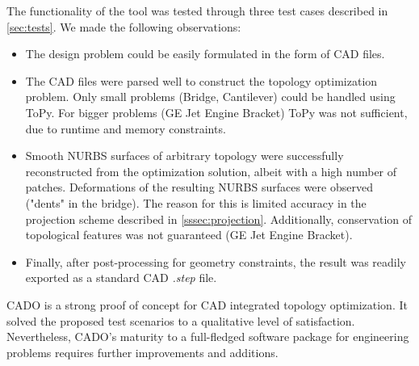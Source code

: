 The functionality of the tool was tested through three test cases described in \autoref{sec:tests}. We made the following observations:
\begin{itemize}
\item The design problem could be easily formulated in the form of CAD files.
\item The CAD files were parsed well to construct the topology optimization problem. Only small problems (Bridge, Cantilever) could be handled using ToPy. For bigger problems (GE Jet Engine Bracket) ToPy was not sufficient, due to runtime and memory constraints.
\item Smooth NURBS surfaces of arbitrary topology were successfully reconstructed from the optimization solution, albeit with a high number of patches. Deformations of the resulting NURBS surfaces were observed ("dents" in the bridge). The reason for this is limited accuracy in the projection scheme described in \autoref{sssec:projection}. Additionally, conservation of topological features was not guaranteed (GE Jet Engine Bracket).
\item Finally, after post-processing for geometry constraints, the result was readily exported as a standard CAD \emph{.step} file.
\end{itemize}
CADO is a strong proof of concept for CAD integrated topology optimization. It solved the proposed test scenarios to a qualitative level of satisfaction. Nevertheless, CADO's maturity to a full-fledged software package for engineering problems requires further improvements and additions.